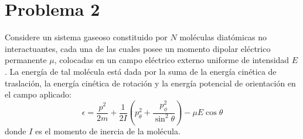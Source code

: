 \documentclass[]{article}
\numberwithin{equation}{section}
\newcommand{\0}{\textcolor{gray}{0}}
\begin{document}
\section{Problema 2}
Considere un sistema gaseoso constituido por $N$ moléculas diatómicas no interactuantes, cada una de las cuales posee un momento dipolar eléctrico permanente $\mu$, colocadas en un campo eléctrico externo uniforme de intensidad $E$. La energía de tal molécula está dada por la suma de la energía cinética de traslación, la energía cinética de rotación y la energía potencial de orientación en el campo aplicado:
\begin{equation}
	\epsilon = \frac{p^2}{2 m} + \frac{1}{2 I}\left(p_\theta^2 + \frac{p_\phi^2}{\sin^2\theta}\right) - \mu E \cos\theta
\end{equation}
donde $I$ es el momento de inercia de la molécula.
\end{document}
